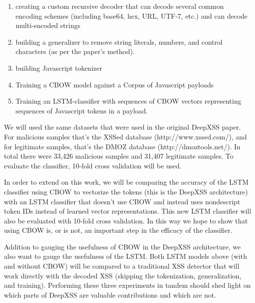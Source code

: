 \documentclass{llncs}
\begin{document}
\begin{enumerate}
    \item creating a custom recursive decoder that can decode several common encoding schemes (including base64, hex, URL, UTF-7, etc.) and can decode multi-encoded strings 
    \item building a generalizer to remove string literals, numbers, and control characters (as per the paper's method).
    \item building Javascript tokenizer
    \item Training a CBOW model against a Corpus of Javascript payloads
    \item Training an LSTM-classifier with sequences of CBOW vectors representing sequences of Javascript tokens in a payload.
\end{enumerate}

We will used the same datasets that were used in the original DeepXSS paper. For malicious samples that's the XSSed database (http://www.xssed.com/), and for legitimate samples, that's the DMOZ database (http://dmoztools.net/). In total there were 33,426 malicious samples and 31,407 legitimate samples. To evaluate the classifier, 10-fold cross validation will be used. 

In order to extend on this work, we will be comparing the accuracy of the LSTM classifier using CBOW to vectorize the tokens (this is the DeepXSS architecture) with an LSTM classifier that doesn't use CBOW and instead uses nondescript token IDs instead of learned vector representations. This new LSTM classifier will also be evaluated with 10-fold cross validation. In this way we hope to show that using CBOW is, or is not, an important step in the efficacy of the classifier. 

Addition to gauging the usefulness of CBOW in the DeepXSS architecture, we also want to gauge the usefulness of the LSTM. Both LSTM models above (with and without CBOW) will be compared to a traditional XSS detector that will work directly with the decoded XSS (skipping the tokenization, generalization, and training). Performing these three experiments in tandem should shed light on which parts of DeepXSS are valuable contributions and which are not. 


\newpage


\end{document}
